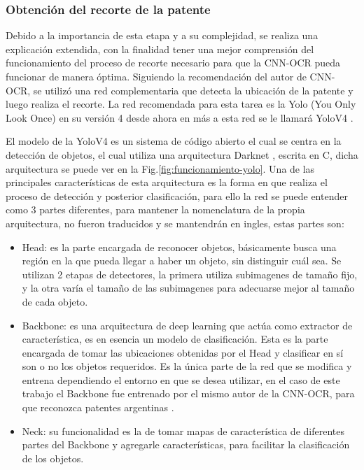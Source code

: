 \subsubsection*{Obtención del recorte de la patente}

Debido a la importancia de esta etapa y a su complejidad, se realiza una explicación extendida, con la finalidad tener una mejor comprensión del funcionamiento del proceso de recorte necesario para que la CNN-OCR pueda funcionar de manera óptima. Siguiendo la recomendación del autor de CNN-OCR, se utilizó una red complementaria que detecta la ubicación de la patente y luego realiza el recorte. La red recomendada para esta tarea es la Yolo (You Only Look Once) en su versión 4 desde ahora en más a esta red se le llamará YoloV4 \cite{bochkovskiy_yolov4_2020}.


El modelo de la YoloV4 es un sistema de código abierto el cual se centra en la detección de objetos, el cual utiliza una arquitectura Darknet \cite{noauthor_darknet_nodate}, escrita en C, dicha arquitectura se puede ver en la Fig.\ref{fig:funcionamiento-yolo}.
Una de las principales características de esta arquitectura es la forma en que realiza el proceso de detección y posterior clasificación, para ello la red se puede entender como 3 partes diferentes, para mantener la nomenclatura de la propia arquitectura, no fueron traducidos y se mantendrán en ingles, estas partes son:

\begin{itemize}
    \item Head: es la parte encargada de reconocer objetos, básicamente busca una región en la que pueda llegar a haber un objeto, sin distinguir cuál sea. Se utilizan 2 etapas de detectores, la primera utiliza subimagenes de tamaño fijo, y la otra varía el tamaño de las subimagenes para adecuarse mejor al tamaño de cada objeto.
    \item Backbone: es una arquitectura de deep learning que actúa como extractor de característica, es en esencia un modelo de clasificación. Esta es la parte encargada de tomar las ubicaciones obtenidas por el Head y clasificar en sí son o no los objetos requeridos. Es la única parte de la red que se modifica y entrena dependiendo el entorno en que se desea utilizar, en el caso de este trabajo el Backbone fue entrenado por el mismo autor de la CNN-OCR, para que reconozca patentes argentinas \cite{ankandrew_localizador_2021}.
    \item Neck: su funcionalidad es la de tomar mapas de característica de diferentes partes del Backbone y agregarle características, para facilitar la clasificación de los objetos.
\end{itemize}

